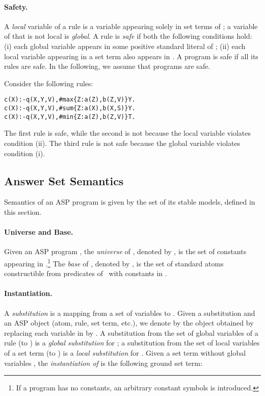 \documentclass{tlp}
\begin{document}
\paragraph{Safety.}
A {\em local} variable of a rule  is a variable appearing solely in set terms of ;
a variable of  that is not local is {\em global}.
A rule  is {\em safe} if both the following conditions hold:
(i) each global variable appears in some positive standard literal of ;
(ii) each local variable appearing in a set term  also appears in .
A program is safe if all its rules are safe.
In the following, we assume that programs are safe.

\begin{example}\label{ex:safety}\rm
Consider the following rules:
\begin{alltt}\small
 c(X) :- q(X,Y,V), #max\{Z: a(Z), b(Z,V)\}  Y.
 c(X) :- q(X,Y,V), #sum\{Z: a(X), b(X,S)\}  Y.
 c(X) :- q(X,Y,V), #min\{Z: a(Z), b(Z,V)\}  T.
\end{alltt}\normalsize
The first rule is safe, while the second is not because the local variable  violates condition (ii).
The third rule is not safe because the global variable  violates condition (i).
\punto
\end{example}


\subsection{Answer Set Semantics}
\label{sec:semantics}

Semantics of an ASP program is given by the set of its stable models, defined in this section.


\paragraph{Universe and Base.}
Given an ASP program \p, the {\em universe} of , denoted by \UP, is the set of constants appearing in \p.\footnote{If a program  has no constants, an arbitrary constant symbols  is introduced.
}
The {\em base} of , denoted by \BP, is the set of standard atoms constructible from predicates of \p\ with constants in \UP.


\paragraph{Instantiation.}
A {\em substitution} is a mapping from a set of variables to .
Given a substitution  and an ASP object   (atom, rule, set term, etc.), we denote by  the object obtained by replacing each variable  in  by .
A substitution from the set of global variables of a rule  (to ) is a {\em global substitution} for ;
a substitution from the set of local variables of a set term  (to ) is a {\em local substitution} for .
Given a set term without global variables , the \emph{instantiation of } is the following ground set term:
\end{document}
